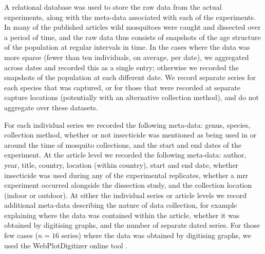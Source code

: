 \documentclass[12pt]{article}
\begin{document}
{A relational database was used to store the raw data from the actual experiments, along with the meta-data associated with each of the experiments. In many of the published articles wild mosquitoes were caught and dissected over a period of time, and the raw data thus consists of snapshots of the age structure of the population at regular intervals in time. In the cases where the data was more sparse (fewer than ten individuals, on average, per date), we aggregated across dates and recorded this as a single entry; otherwise we recorded the snapshots of the population at each different date. We record separate series for each species that was captured, or for those that were recorded at separate capture locations (potentially with an alternative collection method), and do not aggregate over these datasets.

For each individual series we recorded the following meta-data: genus, species, collection method, whether or not insecticide was mentioned as being used in or around the time of mosquito collections, and the start and end dates of the experiment. At the article level we recorded the following meta-data: author, year, title, country, location (within country), start and end date, whether insecticide was used during any of the experimental replicates, whether a mrr experiment occurred alongside the dissection study, and the collection location (indoor or outdoor). At either the individual series or article levels we record additional meta-data describing the nature of data collection, for example explaining where the data was contained within the article, whether it was obtained by digitising graphs, and the number of separate dated series. For those few cases ($n=16$ series) where the data was obtained by digitising graphs, we used the WebPlotDigitizer online tool \citep{digitise}.

}
\end{document}
